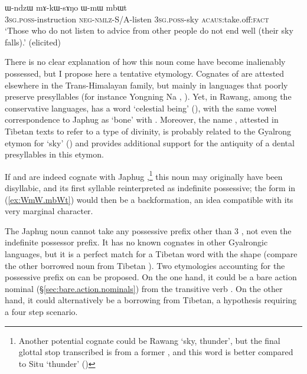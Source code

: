 \begin{exe}
\ex  \label{ex:WmW.mbWt}
\gll  ɯ-ndzɯ mɤ-kɯ-sɤŋo ɯ-mɯ mbɯt  \\
\textsc{3sg}.\textsc{poss}-instruction \textsc{neg}-\textsc{nmlz}-S/A-listen \textsc{3sg}.\textsc{poss}-sky \textsc{acaus}:take.off:\textsc{fact} \\
\glt `Those who do not listen to advice from other people do not end well (their sky falls).' (elicited)
\end{exe}

There is no clear explanation of how this noun come have become inalienably possessed, but I propose here a tentative etymology. Cognates of  are attested elsewhere in the Trans-Himalayan family, but mainly in languages that poorly preserve presyllables (for instance Yongning Na , \citealt[132]{michaud17yongning}). Yet, in Rawang, among the conservative languages, has a word   `celestial being'  (\citealt[13]{lapolla01rawang}), with the same vowel correspondence to Japhug  as   `bone' with . Moreover, the name , attested in Tibetan texts to refer to a type of divinity, is probably related to the Gyalrong etymon for `sky' (\citealt[63--64]{stein61}) and provides additional support for the antiquity of a dental presyllables in this etymon.

If   and  are indeed cognate with Japhug ,\footnote{Another potential cognate could be Rawang   `sky, thunder', but the final glottal stop transcribed  is from a former , and this word is better compared to Situ  `thunder' (\citealt[73]{zhang16bragdbar})} this noun may originally have been disyllabic, and its first syllable reinterpreted as indefinite possessive; the form  in (\ref{ex:WmW.mbWt}) would then be a backformation, an idea compatible with its very marginal character. 
 
The Japhug noun  cannot take any possessive prefix other than 3\sg{} , not even the indefinite possessor prefix. It has no known cognates in other Gyalrongic languages, but it is a perfect match for a Tibetan word with the shape  (compare the other borrowed noun  from Tibetan ). Two etymologies accounting for the possessive prefix on  can be proposed. On the one hand, it could be a bare action nominal (§\ref{sec:bare.action.nominals}) from the transitive verb . On the other hand, it could alternatively be a borrowing from Tibetan, a hypothesis requiring a four step scenario.

